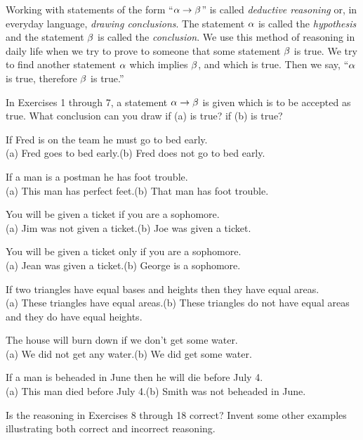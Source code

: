 \documentclass[11pt]{book}
\begin{document}
Working with statements of the form ``$\alpha \rightarrow \beta$'' is called \emph{deductive
reasoning} or, in everyday language, \emph{drawing conclusions}. The statement
$\alpha$ is called the \emph{hypothesis} and the statement $\beta$ is called the
\emph{conclusion}. We use this method of reasoning in daily life when we try to
prove to someone that some statement $\beta$ is true. We try to find another
statement $\alpha$ which implies $\beta$, and which is true. Then we say, ``$\alpha$ is
true, therefore $\beta$ is true.''


In Exercises 1 through 7, a statement $\alpha \rightarrow \beta$ is given which is to be
accepted as true. What conclusion can you draw if (a) is true? if (b) is true?

\begin{exercisecols}
\begin{exlist}
\item If Fred is on the team he must go to bed early.\\
      (a) Fred goes to bed early.\qquad (b) Fred does not go to bed early.
\item If a man is a postman he has foot trouble.\\
      (a) This man has perfect feet.\qquad (b) That man has foot trouble.
\item You will be given a ticket if you are a sophomore.\\
      (a) Jim was not given a ticket.\qquad (b) Joe was given a ticket.
\item You will be given a ticket only if you are a sophomore.\\
      (a) Jean was given a ticket.\qquad (b) George is a sophomore.
\item If two triangles have equal bases and heights then they have equal areas.\\
      (a) These triangles have equal areas.\qquad (b) These triangles do not have
      equal areas and they do have equal heights.
\item The house will burn down if we don't get some water.\\
      (a) We did not get any water.\qquad (b) We did get some water.
\item If a man is beheaded in June then he will die before July 4.\\
      (a) This man died before July 4.\qquad (b) Smith was not beheaded in June.
\end{exlist}

Is the reasoning in Exercises 8 through 18 correct? Invent some other examples
illustrating both correct and incorrect reasoning.


\end{exercisecols}
\end{document}
